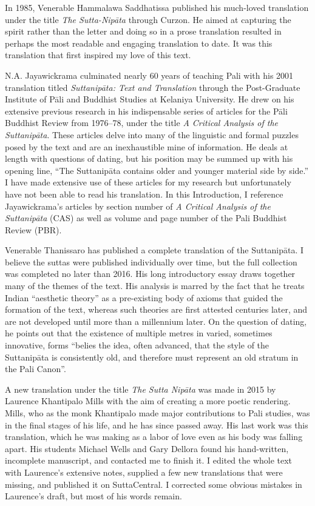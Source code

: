 \documentclass[12pt,openany]{book}%
\begin{document}
In 1985, Venerable Hammalawa Saddhatissa published his much-loved translation under the title \textit{The Sutta-\textsanskrit{Nipāta}} through Curzon. He aimed at capturing the spirit rather than the letter and doing so in a prose translation resulted in perhaps the most readable and engaging translation to date. It was this translation that first inspired my love of this text.

N.A. Jayawickrama culminated nearly 60 years of teaching Pali with his 2001 translation titled \textit{\textsanskrit{Suttanipāta}: Text and Translation} through the Post-Graduate Institute of \textsanskrit{Pāli} and Buddhist Studies at Kelaniya University. He drew on his extensive previous research in his indispensable series of articles for the \textsanskrit{Pāli} Buddhist Review from 1976–78, under the title \textit{A Critical Analysis of the \textsanskrit{Suttanipāta}}. These articles delve into many of the linguistic and formal puzzles posed by the text and are an inexhaustible mine of information. He deals at length with questions of dating, but his position may be summed up with his opening line, “The \textsanskrit{Suttanipāta} contains older and younger material side by side.” I have made extensive use of these articles for my research but unfortunately have not been able to read his translation. In this Introduction, I reference Jayawickrama’s articles by section number of \textit{A Critical Analysis of the \textsanskrit{Suttanipāta}} (CAS) as well as volume and page number of the Pali Buddhist Review (PBR).

Venerable Thanissaro has published a complete translation of the \textsanskrit{Suttanipāta}. I believe the suttas were published individually over time, but the full collection was completed no later than 2016. His long introductory essay draws together many of the themes of the text. His analysis is marred by the fact that he treats Indian “aesthetic theory” as a pre-existing body of axioms that guided the formation of the text, whereas such theories are first attested centuries later, and are not developed until more than a millennium later. On the question of dating, he points out that the existence of multiple metres in varied, sometimes innovative, forms “belies the idea, often advanced, that the style of the \textsanskrit{Suttanipāta} is consistently old, and therefore must represent an old stratum in the Pali Canon”.

A new translation under the title \textit{The Sutta \textsanskrit{Nipāta}} was made in 2015 by Laurence Khantipalo Mills with the aim of creating a more poetic rendering. Mills, who as the monk Khantipalo made major contributions to Pali studies, was in the final stages of his life, and he has since passed away. His last work was this translation, which he was making as a labor of love even as his body was falling apart. His students Michael Wells and Gary Dellora found his hand-written, incomplete manuscript, and contacted me to finish it. I edited the whole text with Laurence’s extensive notes, supplied a few new translations that were missing, and published it on SuttaCentral. I corrected some obvious mistakes in Laurence’s draft, but most of his words remain.
\end{document}
